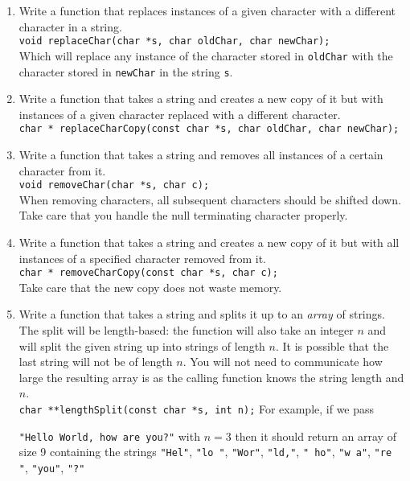 \documentclass[12pt]{scrartcl}
\begin{document}
\begin{enumerate}

  \item Write a function that replaces instances of a given character 
  with a different character in a string.\\
  \texttt{void replaceChar(char *s, char oldChar, char newChar);}\\
  Which will replace any instance of the character stored in 
  \texttt{oldChar} with the character stored in \texttt{newChar} 
  in the string \texttt{s}.  

  \item Write a function that takes a string and creates a new copy of it
  but with instances of a given character replaced with a different character.\\
  \texttt{char * replaceCharCopy(const char *s, char oldChar, char newChar);}\\

  \item Write a function that takes a string and removes all instances 
  of a certain character from it.\\
  \texttt{void removeChar(char *s, char c);}\\
  When removing characters, all subsequent characters should be 
  shifted down.  Take care that you handle the null terminating character 
  properly.

  \item Write a function that takes a string and creates a new copy of
  it but with all instances of a specified character removed from it.\\
  \texttt{char * removeCharCopy(const char *s, char c);}\\
  Take care that the new copy does not waste memory.

  \item Write a function that takes a string and splits it up to an 
  \emph{array} of strings.  The split will be length-based: the function 
  will also take an integer $n$ and will split the given string up into 
  strings of length $n$.  It is possible that the last string will not 
  be of length $n$.  You will not need to communicate how large the 
  resulting array is as the calling function knows the string length 
  and $n$.\\
  \texttt{char **lengthSplit(const char *s, int n);}
  For example, if we pass 
  
  \texttt{"Hello World, how are you?"} with $n = 3$ then it 
  should return an array of size 9 containing the strings \texttt{"Hel"}, \texttt{"lo "}, \texttt{"Wor"}, 
\texttt{"ld,"}, \texttt{" ho"}, \texttt{"w a"}, \texttt{"re "}, \texttt{"you"}, \texttt{"?"}

\end{enumerate}
\end{document}
